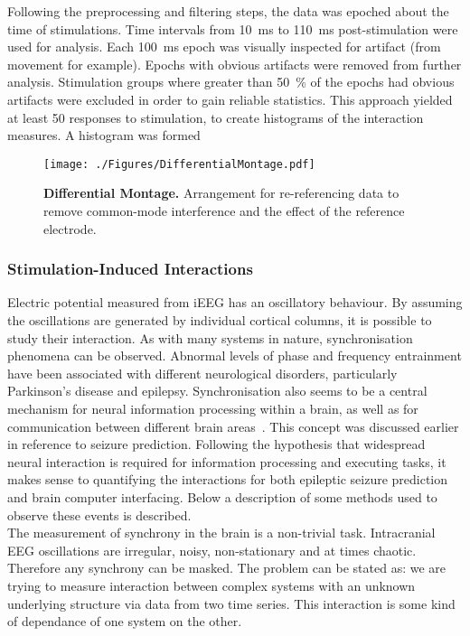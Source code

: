 \documentclass[]{article}
\begin{document}
Following the preprocessing and filtering steps, the data was epoched about the time of stimulations. Time intervals from 10~ms to 110~ms post-stimulation were used for analysis. Each 100~ms epoch was visually inspected for artifact (from movement for example). Epochs with obvious artifacts were removed from further analysis. Stimulation groups where greater than 50~\% of the epochs had obvious artifacts were excluded in order to gain reliable statistics. This approach yielded at least 50 responses to stimulation, to create histograms of the interaction measures. A histogram was formed
\begin{figure}[htbp]
	\centering
		\texttt{[image: ./Figures/DifferentialMontage.pdf]}
	\caption{\textbf{Differential Montage.} Arrangement for re-referencing data to remove common-mode interference and the effect of the reference electrode.}
	\label{fig:DifMontage}
\end{figure}

\subsubsection{Stimulation-Induced Interactions}
Electric potential measured from iEEG has
an oscillatory behaviour. By assuming the oscillations are generated
by individual cortical columns, it is possible to study their
interaction. As with many systems in nature, synchronisation
phenomena can be observed. Abnormal levels of phase and frequency
entrainment have been associated with different neurological
disorders, particularly Parkinson's disease and epilepsy.
Synchronisation also seems to be a central mechanism for neural
information processing within a brain, as well as for communication
between different brain areas~\cite{Rosenblum2001}. This concept
was discussed earlier in reference to seizure prediction. Following
the hypothesis that widespread neural interaction is required for
information processing and executing tasks, it makes sense to
quantifying the interactions for both epileptic seizure prediction
and brain computer interfacing. Below a description of some methods
used to observe these events is described.\\

The measurement of synchrony in the brain is a non-trivial task.
Intracranial EEG oscillations are irregular, noisy, non-stationary
and at times chaotic. Therefore any synchrony can be masked. The
problem can be stated as: we are trying to measure interaction
between complex systems with an unknown underlying structure via
data from two time series. This interaction is some kind of
dependance of one system on the other.\\
\end{document}
